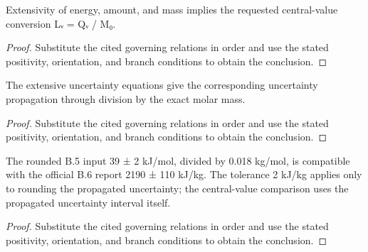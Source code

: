 \begin{lemma}
  \label{lem:physics:IPhO_2026_4_B_6:aux013}
  Extensivity of energy, amount, and mass implies the requested central-value conversion Lᵥ = Qᵥ / M₀.
\end{lemma}
\begin{proof}
  Substitute the cited governing relations in order and use the stated positivity, orientation, and branch conditions to obtain the conclusion.
\end{proof}

\begin{lemma}
  \label{lem:physics:IPhO_2026_4_B_6:aux014}
  The extensive uncertainty equations give the corresponding uncertainty propagation through division by the exact molar mass.
\end{lemma}
\begin{proof}
  Substitute the cited governing relations in order and use the stated positivity, orientation, and branch conditions to obtain the conclusion.
\end{proof}

\begin{lemma}
  \label{lem:physics:IPhO_2026_4_B_6:aux015}
  The rounded B.5 input 39 ± 2 kJ/mol, divided by 0.018 kg/mol, is compatible with the official B.6 report 2190 ± 110 kJ/kg. The tolerance 2 kJ/kg applies only to rounding the propagated uncertainty; the central-value comparison uses the propagated uncertainty interval itself.
\end{lemma}
\begin{proof}
  Substitute the cited governing relations in order and use the stated positivity, orientation, and branch conditions to obtain the conclusion.
\end{proof}

